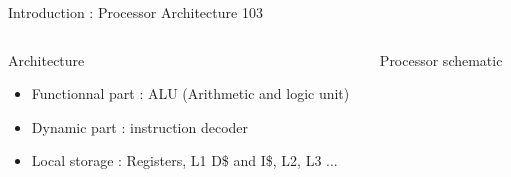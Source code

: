 %
\begin{Frame}{Introduction : Processor Architecture 103}
  \begin{columns}[t]
    \begin{column}{\BW} %
      \begin{block}{Architecture}
        \begin{itemize}
        \item Functionnal part : ALU (Arithmetic and logic unit)
        \item Dynamic part : instruction decoder
        \item Local storage : Registers, L1 D\$ and I\$, L2, L3 ...
        \end{itemize}
      \end{block} 
    \end{column}
    
    \begin{column}{\BW} %
      \begin{block}{Processor schematic}
      \end{block}   
    \end{column}
  \end{columns}  
\end{Frame}


